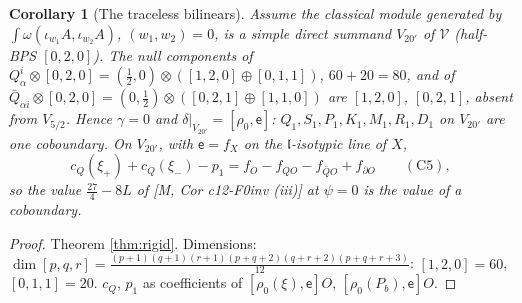 \documentclass[10pt]{article}
\newtheorem{corollary}[theorem]{Corollary}
\theoremstyle{definition}
\newcommand{\V}{\mathcal V}
\newcommand{\lf}{\mathfrak l}
\newcommand{\ee}{\mathsf e}
\begin{document}
\begin{corollary}[The traceless bilinears]\label{cor:20}
Assume the classical module generated by $\int\omega(\iota_{w_1}A,\iota_{w_2}A)$, $(w_1,w_2)=0$, is a simple direct summand $V_{20'}$ of $\V$ (half-BPS $[0,2,0]$). The null components of $Q^i_\alpha\otimes[0,2,0]=(\tfrac12,0)\otimes([1,2,0]\oplus[0,1,1])$, $60+20=80$, and of $\bar Q_{\dot\alpha i}\otimes[0,2,0]=(0,\tfrac12)\otimes([0,2,1]\oplus[1,1,0])$ are $[1,2,0]$, $[0,2,1]$, absent from $V_{5/2}$. Hence $\gamma=0$ and $\delta|_{V_{20'}}=[\rho_0,\ee]$: $Q_1,S_1,P_1,K_1,M_1,R_1,D_1$ on $V_{20'}$ are one coboundary. On $V_{20'}$, with $\ee=f_X$ on the $\lf$-isotypic line of $X$,
\[
c_Q(\xi_+)+c_Q(\xi_-)-p_1=f_O-f_{QO}-f_{\bar QO}+f_{\partial O}\qquad(\text{C5}),
\]
so the value $\tfrac{27}4-8L$ of [M, Cor c12-F0inv (iii)] at $\psi=0$ is the value of a coboundary.
\end{corollary}
\begin{proof}
Theorem \ref{thm:rigid}. Dimensions: $\dim[p,q,r]=\frac{(p+1)(q+1)(r+1)(p+q+2)(q+r+2)(p+q+r+3)}{12}$: $[1,2,0]=60$, $[0,1,1]=20$. $c_Q$, $p_1$ as coefficients of $[\rho_0(\xi),\ee]O$, $[\rho_0(P_b),\ee]O$.
\end{proof}
\end{document}
